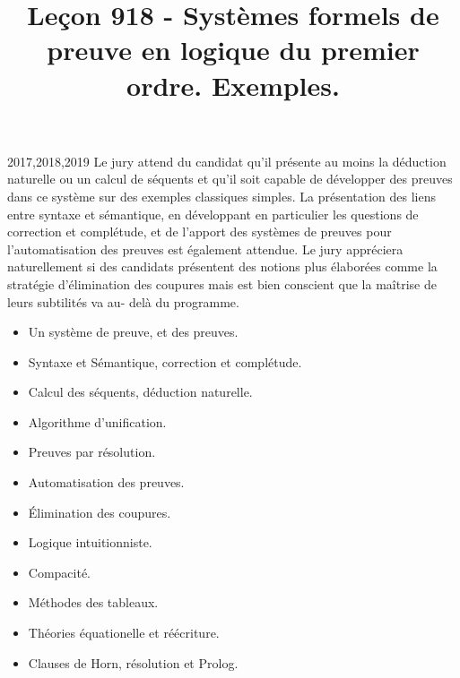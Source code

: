 \documentclass{agregfiche}
\title{Leçon 918 - Systèmes formels de preuve en logique du premier ordre. Exemples.}
\begin{document}
\maketitle

\secrapports
\begin{rapport}{2017,2018,2019}
	Le jury attend du candidat qu’il présente au moins la déduction naturelle ou un calcul de séquents
	et qu’il soit capable de développer des preuves dans ce système sur des exemples classiques simples.
	La présentation des liens entre syntaxe et sémantique, en développant en particulier les questions de
	correction et complétude, et de l’apport des systèmes de preuves pour l’automatisation des preuves est
	également attendue.
	Le jury appréciera naturellement si des candidats présentent des notions plus élaborées comme la
	stratégie d’élimination des coupures mais est bien conscient que la maîtrise de leurs subtilités va au-
	delà du programme.
\end{rapport}

\secindispensables

\begin{itemize}
	\item Un système de preuve, et des preuves.
	\item Syntaxe et Sémantique, correction et complétude.
\end{itemize}

\secasavoir

\begin{itemize}
	\item Calcul des séquents, déduction naturelle.
	\item Algorithme d'unification.
	\item Preuves par résolution.
	\item Automatisation des preuves.
\end{itemize}

\secidees

\begin{itemize}
	\item Élimination des coupures.
	\item Logique intuitionniste.
	\item Compacité.
	\item Méthodes des tableaux.
	\item Théories équationelle et réécriture.
	\item Clauses de Horn, résolution et Prolog.
\end{itemize}

\secpieges
\end{document}
